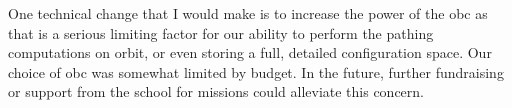 One technical change that I would make is to increase the power of the \gls{obc} as that is a serious limiting factor for our ability to perform the pathing computations on orbit, or even storing a full, detailed configuration space. Our choice of \gls{obc} was somewhat limited by budget. In the future, further fundraising or support from the school for missions could alleviate this concern.

